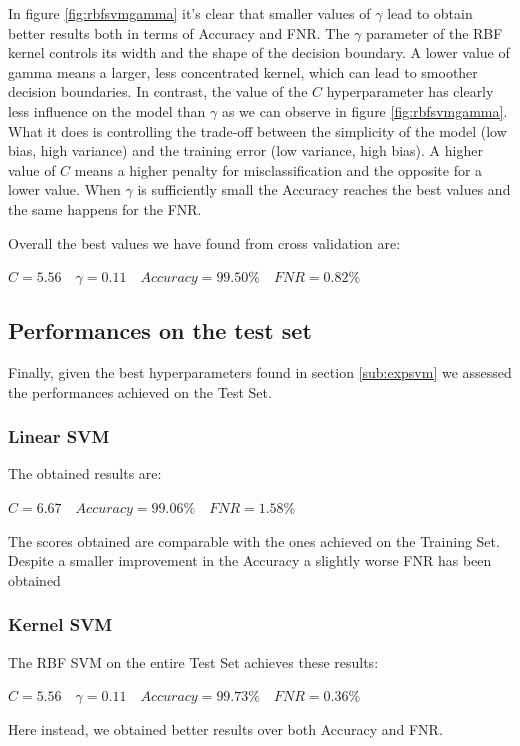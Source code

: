 \documentclass[twocolumn, switch]{article} %
\begin{document}
In figure \ref{fig:rbfsvmgamma} it's clear that smaller values of $\gamma$ lead to obtain better results both in terms of Accuracy and FNR. The $\gamma$ parameter of the RBF kernel controls its width and the shape of the decision boundary. A lower value of gamma means a larger, less concentrated kernel, which can lead to smoother decision boundaries.\newline
In contrast, the value of the $C$ hyperparameter has clearly less influence on the model than $\gamma$ as we can observe in figure \ref{fig:rbfsvmgamma}. What it does is controlling the trade-off between the simplicity of the model (low bias, high variance) and the training error (low variance, high bias). A higher value of $C$ means a higher penalty for misclassification and the opposite for a lower value.
When $\gamma$ is sufficiently small the Accuracy reaches the best values and the same happens for the FNR.

Overall the best values we have found from cross validation are:
\begin{center}
	$C=5.56\quad\gamma=0.11 \quad Accuracy=99.50\% \quad FNR=0.82\%$
\end{center}

\subsection{Performances on the test set}
Finally, given the best hyperparameters found in section \ref{sub:expsvm} we assessed the performances achieved on the Test Set.
\subsubsection{Linear SVM}
The obtained results are:
\begin{center}
	$C=6.67 \quad Accuracy=99.06\% \quad FNR=1.58\%$
\end{center}
The scores obtained are comparable with the ones achieved on the Training Set. Despite a smaller improvement in the Accuracy a slightly worse FNR has been obtained

\subsubsection{Kernel SVM}
The RBF SVM on the entire Test Set achieves these results:
\begin{center}
	$C=5.56 \quad \gamma=0.11 \quad Accuracy=99.73\% \quad FNR=0.36\%$
\end{center}
Here instead, we obtained better results over both Accuracy and FNR.
\end{document}
